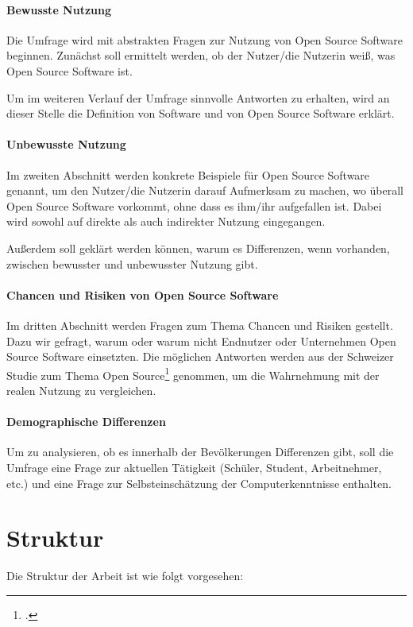 \documentclass[a4paper]{article}
\begin{document}
		\paragraph{Bewusste Nutzung}
			Die Umfrage wird mit abstrakten Fragen zur Nutzung von Open Source Software beginnen. Zunächst soll ermittelt werden, ob der Nutzer/die Nutzerin weiß, was Open Source Software ist.
		
			Um im weiteren Verlauf der Umfrage sinnvolle Antworten zu erhalten, wird an dieser Stelle die Definition von Software und von Open Source Software erklärt.
		
		
		\paragraph{Unbewusste Nutzung}
			Im zweiten Abschnitt werden konkrete Beispiele für Open Source Software genannt, um den Nutzer/die Nutzerin  darauf Aufmerksam zu machen, wo überall Open Source Software vorkommt, ohne dass es ihm/ihr aufgefallen ist. Dabei wird sowohl auf direkte als auch indirekter Nutzung eingegangen.
		
			Außerdem soll geklärt werden können, warum es Differenzen, wenn vorhanden, zwischen bewusster und unbewusster Nutzung gibt.
		
		\paragraph{Chancen und Risiken von Open Source Software}
			Im dritten Abschnitt werden Fragen zum Thema Chancen und Risiken gestellt. Dazu wir gefragt, warum oder warum nicht Endnutzer oder Unternehmen Open Source Software einsetzten. Die möglichen Antworten werden aus der Schweizer Studie zum Thema Open Source\footcite{oss:studie} genommen, um die Wahrnehmung mit der realen Nutzung zu vergleichen.
		
		\paragraph{Demographische Differenzen}
			Um zu analysieren, ob es innerhalb der Bevölkerungen Differenzen gibt, soll die Umfrage eine Frage zur aktuellen Tätigkeit (Schüler, Student, Arbeitnehmer, etc.) und eine Frage zur Selbsteinschätzung der Computerkenntnisse enthalten.
	   
	   
	\section{Struktur}
		Die Struktur der Arbeit ist wie folgt vorgesehen:
		
\end{document}
